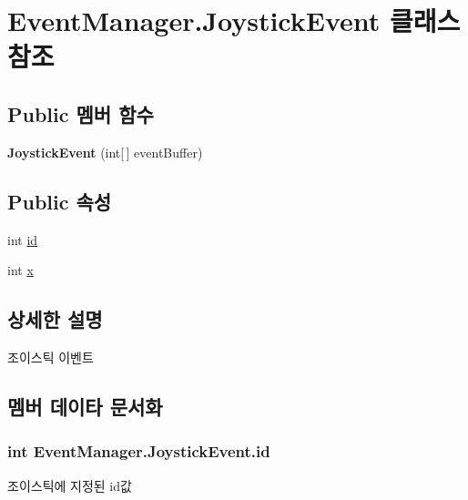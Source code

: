 \hypertarget{class_event_manager_1_1_joystick_event}{}\section{Event\+Manager.\+Joystick\+Event 클래스 참조}
\label{class_event_manager_1_1_joystick_event}
\subsection*{Public 멤버 함수}
\begin{DoxyCompactItemize}
\item 
\hypertarget{class_event_manager_1_1_joystick_event_aca05ec32534389efa3e4b675040b5c4e}{}{\bfseries Joystick\+Event} (int\mbox{[}$\,$\mbox{]} event\+Buffer)\label{class_event_manager_1_1_joystick_event_aca05ec32534389efa3e4b675040b5c4e}

\end{DoxyCompactItemize}
\subsection*{Public 속성}
\begin{DoxyCompactItemize}
\item 
int \hyperlink{class_event_manager_1_1_joystick_event_ad734e79a6a5d0c7304015d06f3c0863c}{id}
\item 
int \hyperlink{class_event_manager_1_1_joystick_event_a46fa188ab73a143068f0db144189258c}{x}
\end{DoxyCompactItemize}


\subsection{상세한 설명}
조이스틱 이벤트 

\subsection{멤버 데이타 문서화}
\hypertarget{class_event_manager_1_1_joystick_event_ad734e79a6a5d0c7304015d06f3c0863c}{}
\subsubsection[{id}]{\setlength{\rightskip}{0pt plus 5cm}int Event\+Manager.\+Joystick\+Event.\+id}\label{class_event_manager_1_1_joystick_event_ad734e79a6a5d0c7304015d06f3c0863c}
조이스틱에 지정된 id값 \hypertarget{class_event_manager_1_1_joystick_event_a46fa188ab73a143068f0db144189258c}{}
